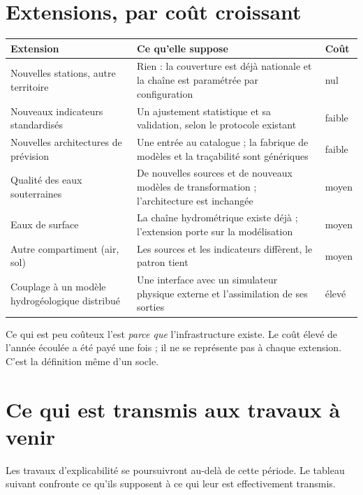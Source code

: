 \section{Extensions, par coût croissant}

\begin{center}
\begin{tabularx}{\textwidth}{@{}lXl@{}}
\toprule
\textbf{Extension} & \textbf{Ce qu'elle suppose} & \textbf{Coût} \\
\midrule
Nouvelles stations, autre territoire & Rien : la couverture est déjà nationale et la chaîne est
paramétrée par configuration & nul \\
Nouveaux indicateurs standardisés & Un ajustement statistique et sa validation, selon le
protocole existant & faible \\
Nouvelles architectures de prévision & Une entrée au catalogue ; la fabrique de modèles et la
traçabilité sont génériques & faible \\
Qualité des eaux souterraines & De nouvelles sources et de nouveaux modèles de transformation ;
l'architecture est inchangée & moyen \\
Eaux de surface & La chaîne hydrométrique existe déjà ; l'extension porte sur la modélisation &
moyen \\
Autre compartiment (air, sol) & Les sources et les indicateurs diffèrent, le patron tient &
moyen \\
Couplage à un modèle hydrogéologique distribué & Une interface avec un simulateur physique
externe et l'assimilation de ses sorties & élevé \\
\bottomrule
\end{tabularx}
\end{center}

Ce qui est peu coûteux l'est \emph{parce que}
l'infrastructure existe. Le coût élevé de l'année écoulée a été payé une fois ; il ne se
représente pas à chaque extension. C'est la définition même d'un socle.

\section{Ce qui est transmis aux travaux à venir}

Les travaux d'explicabilité se poursuivront au-delà de cette période. Le tableau suivant
confronte ce qu'ils supposent à ce qui leur est effectivement transmis.

